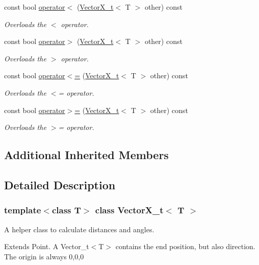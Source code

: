 \begin{DoxyCompactItemize}
const bool \hyperlink{class_vector_x__t_a4e568334b218fda51d03636310f23ab4}{operator$<$} (\hyperlink{class_vector_x__t}{Vector\+X\+\_\+t}$<$ T $>$ other) const
\begin{DoxyCompactList}\small\item\em Overloads the $<$ operator. \end{DoxyCompactList}\item 
const bool \hyperlink{class_vector_x__t_a311676a873e6851386a71d5b781d77fc}{operator$>$} (\hyperlink{class_vector_x__t}{Vector\+X\+\_\+t}$<$ T $>$ other) const
\begin{DoxyCompactList}\small\item\em Overloads the $>$ operator. \end{DoxyCompactList}\item 
const bool \hyperlink{class_vector_x__t_a4aa8b297bdb6c3e51c004520bff95f73}{operator$<$=} (\hyperlink{class_vector_x__t}{Vector\+X\+\_\+t}$<$ T $>$ other) const
\begin{DoxyCompactList}\small\item\em Overloads the $<$= operator. \end{DoxyCompactList}\item 
const bool \hyperlink{class_vector_x__t_a5e7b917f91229508634bc8ab57a3b02c}{operator$>$=} (\hyperlink{class_vector_x__t}{Vector\+X\+\_\+t}$<$ T $>$ other) const
\begin{DoxyCompactList}\small\item\em Overloads the $>$= operator. \end{DoxyCompactList}\end{DoxyCompactItemize}
\subsection*{Additional Inherited Members}


\subsection{Detailed Description}
\subsubsection*{template$<$class T$>$\newline
class Vector\+X\+\_\+t$<$ T $>$}

A helper class to calculate distances and angles. 

Extends Point. A Vector\+\_\+t$<$\+T$>$ contains the end position, but also direction. The origin is always 0,0,0

